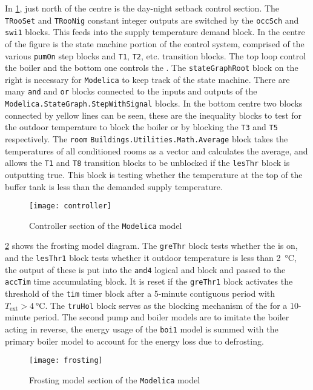 In \cref{fig:controllersec}, just north of the centre is the day-night setback control section. The \texttt{TRooSet} and \texttt{TRooNig} constant integer outputs are switched by the \texttt{occSch} and \texttt{swi1} blocks. This feeds into the supply temperature demand block. In the centre of the figure is the state machine portion of the control system, comprised of the various \texttt{pumOn} step blocks and \texttt{T1}, \texttt{T2}, etc. transition blocks. The top loop control the boiler and the bottom one controls the \HP. The \texttt{stateGraphRoot} block on the right is necessary for \texttt{Modelica} to keep track of the state machine. There are many \texttt{and} and \texttt{or} blocks connected to the inputs and outputs of the \texttt{Modelica.StateGraph.StepWithSignal} blocks. In the bottom centre two blocks connected by yellow lines can be seen, these are the inequality blocks to test for the outdoor temperature to block the boiler or \HP by blocking the \texttt{T3} and \texttt{T5} respectively. The \texttt{room} \texttt{Buildings.Utilities.Math.Average} block takes the temperatures of all conditioned rooms as a vector and calculates the average, and allows the \texttt{T1} and \texttt{T8} transition blocks to be unblocked if the \texttt{lesThr} block is outputting true. This block is testing whether the temperature at the top of the buffer tank is less than the demanded supply temperature. 
\begin{figure}[htb]
    \centering
    \texttt{[image: controller]}
    \caption{Controller section of the \texttt{Modelica} model}
    \label{fig:controllersec}
\end{figure}

\cref{fig:frostingmodelsec} shows the frosting model diagram. The \texttt{greThr} block tests whether the \HP is on, and the \texttt{lesThr1} block tests whether it outdoor temperature is less than \qty{2}{\celsius}, the output of these is put into the \texttt{and4} logical and block and passed to the \texttt{accTim} time accumulating block. It is reset if the \texttt{greThr1} block activates the threshold of the \texttt{tim} timer block after a 5-minute contiguous period with $T_\text{ext}>\qty{4}{\celsius}$. The \texttt{truHol} block serves as the blocking mechanism of the \HP for a 10-minute period. The second pump and boiler models are to imitate the boiler acting in reverse, the energy usage of the \texttt{boi1} model is summed with the primary boiler model to account for the energy loss due to defrosting. 
\begin{figure}[htb]
    \centering
    \texttt{[image: frosting]}
    \caption{Frosting model section of the \texttt{Modelica} model}
    \label{fig:frostingmodelsec}
\end{figure}

